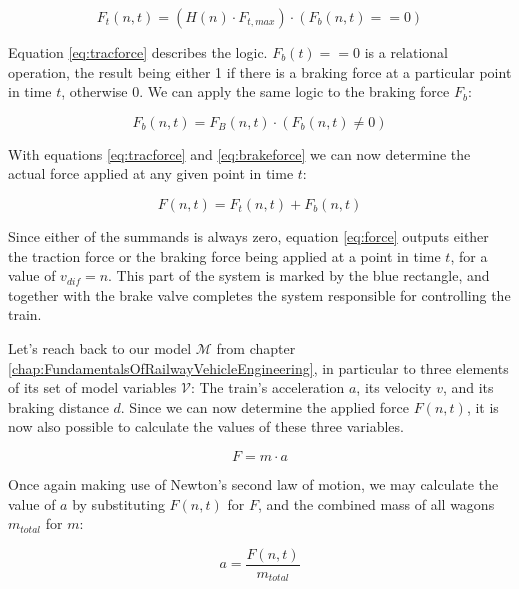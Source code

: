 \begin{equation}
\label{eq:tracforce}
F_{t}(n,t) = (H(n) \cdot F_{t,max}) \cdot (F_{b}(n,t) == 0) 
\end{equation}

\noindent
Equation \ref{eq:tracforce} describes the logic. $F_{b}(t) == 0$ is a relational operation, the result being either 1 if there is a braking force at a particular point in time $t$, otherwise 0. We can apply the same logic to the braking force $F_{b}$:

\begin{equation}
\label{eq:brakeforce}
F_{b}(n,t) = F_{B}(n,t) \cdot (F_{b}(n,t) \neq 0)
\end{equation}

\noindent
With equations \ref{eq:tracforce} and \ref{eq:brakeforce} we can now determine the actual force applied at any given point in time $t$:

\begin{equation}
\label{eq:force}
F(n,t) = F_{t}(n,t) + F_{b}(n,t) 
\end{equation} 

\noindent
Since either of the summands is always zero, equation \ref{eq:force} outputs either the traction force or the braking force being applied at a point in time $t$, for a value of $v_{dif} = n$. This part of the system is marked by the blue rectangle, and together with the brake valve completes the system responsible for controlling the train.
\par\noindent
Let's reach back to our model ${\mathcal{M}}$ from chapter \ref{chap:FundamentalsOfRailwayVehicleEngineering}, in particular to three elements of its set of model variables ${\mathcal{V}}$: The train's acceleration $a$, its velocity $v$, and its braking distance $d$. Since we can now determine the applied force $F(n,t)$, it is now also possible to calculate the values of these three variables.

\begin{equation}
\label{eq:newton}
F = m \cdot a
\end{equation}

\noindent
Once again making use of Newton's second law of motion, we may calculate the value of $a$ by substituting $F(n,t)$ for $F$, and the combined mass of all wagons $m_{total}$ for $m$:

\begin{equation}
\label{eq:acceleration}
a = \frac{F(n,t)}{m_{total}}
\end{equation}
	
